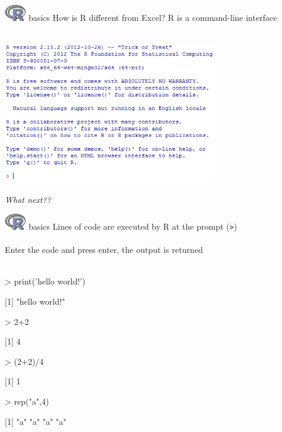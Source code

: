 \documentclass[xcolor=svgnames]{beamer}
\begin{document}
\begin{frame}[t]{\includegraphics[width=0.07\textwidth]{Rlogo.jpg} \hspace{0.01in} basics}
How is R different from Excel? R is a command-line interface\\~\\
\centerline{\includegraphics[width=0.7\textwidth]{command_line.png}}
\centerline{\emph{What next??}}
\end{frame}

\begin{frame}[fragile]{\includegraphics[width=0.07\textwidth]{Rlogo.jpg} \hspace{0.01in} basics}
Lines of code are executed by R at the prompt (\textit{\texttt{>}})\\~\\
Enter the code and press enter, the output is returned\\~\\
\begin{Schunk}
\begin{Sinput}
> print('hello world!')
\end{Sinput}
[1] "hello world!"\begin{Sinput}
> 2+2
\end{Sinput}
[1] 4\begin{Sinput}
> (2+2)/4
\end{Sinput}
[1] 1\begin{Sinput}
> rep("a",4)
\end{Sinput}
[1] "a" "a" "a" "a"\end{Schunk}

\end{frame}
\end{document}
